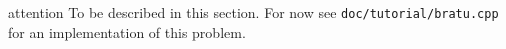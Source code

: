 \documentclass[a4paper]{book}
\newcommand{\ficnota}{attention}
\newenvironment{nota}{%
  \begin{pictonote}{\ficnota}}{\end{pictonote}}
\begin{document}
\begin{nota}
  To be described in this section. For now see
  \texttt{doc/tutorial/bratu.cpp} for an implementation of this
  problem.
\end{nota}



\appendix
\newpage



\end{document}
